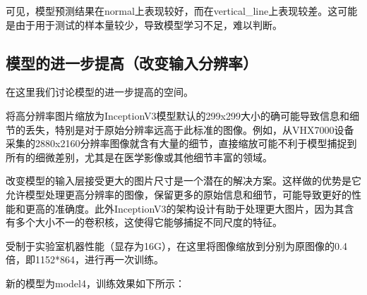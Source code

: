 可见，模型预测结果在normal上表现较好，而在vertical\_line上表现较差。这可能是由于用于测试的样本量较少，导致模型学习不足，难以判断。


\subsection{模型的进一步提高（改变输入分辨率）}

在这里我们讨论模型的进一步提高的空间。

将高分辨率图片缩放为InceptionV3模型默认的299x299大小的确可能导致信息和细节的丢失，特别是对于原始分辨率远高于此标准的图像。例如，从VHX7000设备采集的2880x2160分辨率图像就含有大量的细节，直接缩放可能不利于模型捕捉到所有的细微差别，尤其是在医学影像或其他细节丰富的领域。

改变模型的输入层接受更大的图片尺寸是一个潜在的解决方案。这样做的优势是它允许模型处理更高分辨率的图像，保留更多的原始信息和细节，可能导致更好的性能和更高的准确度。此外InceptionV3的架构设计有助于处理更大图片，因为其含有多个大小不一的卷积核，这使得它能够捕捉不同尺度的特征。

受制于实验室机器性能（显存为16G），在这里将图像缩放到分别为原图像的0.4倍，即1152*864，进行再一次训练。

新的模型为model4，训练效果如下所示：

